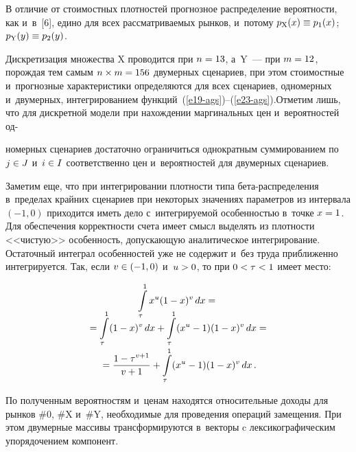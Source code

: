 \begin{multicols}{2}
  В отличие от стоимостных плотностей про\-гноз\-ное распределение 
вероятности, как и~в~[6], едино для всех рассматриваемых рынков, и~потому
  $p_{\mathrm{X}}(x)\hm\equiv p_1(x)$; $p_{\mathrm{Y}}(y)\hm\equiv p_2(y)$. 
  
  Дискретизация множества {\sf X} проводится при $n\hm=13$, а~{\sf Y}~--- 
при $m \hm= 12$, порождая тем самым $n\times m\hm= 156$ двумерных 
сценариев, при этом\linebreak
 стоимостные и~прогнозные характеристики опре\-деляются 
для всех сценариев, одномерных и~дву\-мерных, интегрированием 
функций~(\ref{e19-ags})--(\ref{e23-ags}).\linebreak Отметим лишь, что для дискретной 
модели при
 нахождении маргинальных цен и~вероятностей од-\linebreak\vspace*{-12pt}

\columnbreak

\noindent
номерных 
сценариев достаточно ограничиться однократным суммированием по $j\hm\in 
J$ и~$i\hm\in I$ соответственно цен и~вероятностей для двумерных сценариев. 
  
  Заметим еще, что при интегрировании плот\-ности типа 
 бе\-та-рас\-пре\-де\-ле\-ния в~пределах крайних сценариев при некоторых 
значениях параметров из интервала $(-1, 0)$ приходится иметь дело 
с~интегрируемой особенностью в~точке $x\hm= 1$. Для обеспечения 
корректности счета имеет смысл выделять из плотности <<чистую>> 
особенность, допускающую аналитическое интегрирование. Остаточный 
интеграл особенностей уже не содержит и~без труда приближенно 
интегрируется. Так, если $v\hm\in (-1,0)$ и~$u\hm>0$, то при $0\hm<\tau \hm< 1$ 
имеет место:

\vspace*{-12pt}

\noindent
  \begin{multline*}
  \int\limits^1_\tau x^u(1-x)^v \,dx={}\\[-12pt]
  {}=\int\limits_\tau^1(1-x)^v \,dx+\int\limits_\tau^1 
(x^u-1)(1-x)^v \,dx={}\\[-2pt]
  {}=\displaystyle\frac{\displaystyle 1-\tau^{v+1}\mathstrut}{\displaystyle v+1\mathstrut} +\int\limits^1_\tau (x^u-1)(1-x)^v \,dx\,.
  \end{multline*}
  
  \vspace*{-12pt}
  
  По полученным вероятностям и~ценам находятся относительные доходы для 
рынков \#0, \#X и~\#Y, необходимые для проведения операций замещения. При 
этом двумерные массивы трансформируются в~векторы c лексикографическим 
упорядочением компонент.
  

\end{multicols}
